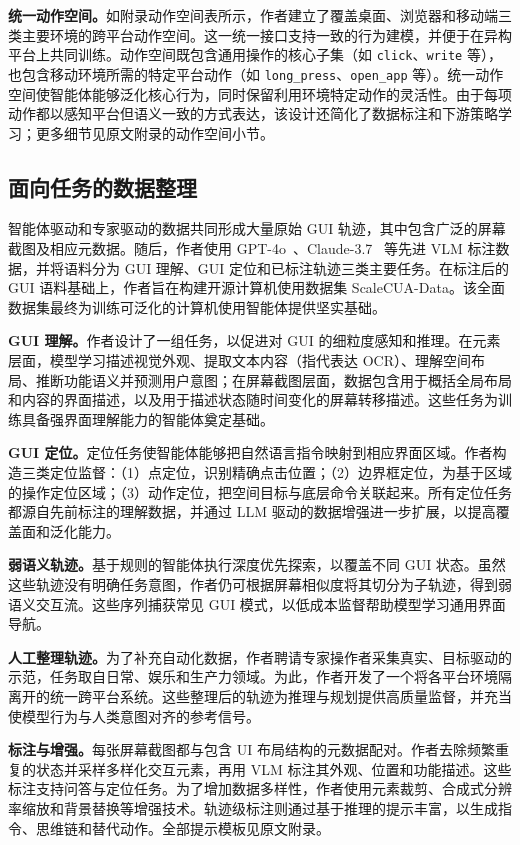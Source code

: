 \documentclass[10pt,twocolumn]{article}
\newcommand{\ourdataset}{ScaleCUA-Data\xspace}
\begin{document}
\textbf{统一动作空间。}如附录动作空间表所示，作者建立了覆盖桌面、浏览器和移动端三类主要环境的跨平台动作空间。这一统一接口支持一致的行为建模，并便于在异构平台上共同训练。动作空间既包含通用操作的核心子集（如 \texttt{click}、\texttt{write} 等），也包含移动环境所需的特定平台动作（如 \texttt{long\_press}、\texttt{open\_app} 等）。统一动作空间使智能体能够泛化核心行为，同时保留利用环境特定动作的灵活性。由于每项动作都以感知平台但语义一致的方式表达，该设计还简化了数据标注和下游策略学习；更多细节见原文附录的动作空间小节。

\subsection{面向任务的数据整理}
智能体驱动和专家驱动的数据共同形成大量原始 GUI 轨迹，其中包含广泛的屏幕截图及相应元数据。随后，作者使用 GPT-4o~\citep{hurst2024gpt}、Claude-3.7~\citep{anthropic2025claude37} 等先进 VLM 标注数据，并将语料分为 GUI 理解、GUI 定位和已标注轨迹三类主要任务。在标注后的 GUI 语料基础上，作者旨在构建开源计算机使用数据集 \ourdataset。该全面数据集最终为训练可泛化的计算机使用智能体提供坚实基础。



\textbf{GUI 理解。}作者设计了一组任务，以促进对 GUI 的细粒度感知和推理。在元素层面，模型学习描述视觉外观、提取文本内容（指代表达 OCR）、理解空间布局、推断功能语义并预测用户意图；在屏幕截图层面，数据包含用于概括全局布局和内容的界面描述，以及用于描述状态随时间变化的屏幕转移描述。这些任务为训练具备强界面理解能力的智能体奠定基础。

\textbf{GUI 定位。}定位任务使智能体能够把自然语言指令映射到相应界面区域。作者构造三类定位监督：（1）点定位，识别精确点击位置；（2）边界框定位，为基于区域的操作定位区域；（3）动作定位，把空间目标与底层命令关联起来。所有定位任务都源自先前标注的理解数据，并通过 LLM 驱动的数据增强进一步扩展，以提高覆盖面和泛化能力。

\textbf{弱语义轨迹。}基于规则的智能体执行深度优先探索，以覆盖不同 GUI 状态。虽然这些轨迹没有明确任务意图，作者仍可根据屏幕相似度将其切分为子轨迹，得到弱语义交互流。这些序列捕获常见 GUI 模式，以低成本监督帮助模型学习通用界面导航。

\textbf{人工整理轨迹。}为了补充自动化数据，作者聘请专家操作者采集真实、目标驱动的示范，任务取自日常、娱乐和生产力领域。为此，作者开发了一个将各平台环境隔离开的统一跨平台系统。这些整理后的轨迹为推理与规划提供高质量监督，并充当使模型行为与人类意图对齐的参考信号。

\textbf{标注与增强。}每张屏幕截图都与包含 UI 布局结构的元数据配对。作者去除频繁重复的状态并采样多样化交互元素，再用 VLM 标注其外观、位置和功能描述。这些标注支持问答与定位任务。为了增加数据多样性，作者使用元素裁剪、合成式分辨率缩放和背景替换等增强技术。轨迹级标注则通过基于推理的提示丰富，以生成指令、思维链和替代动作。全部提示模板见原文附录。
\end{document}

